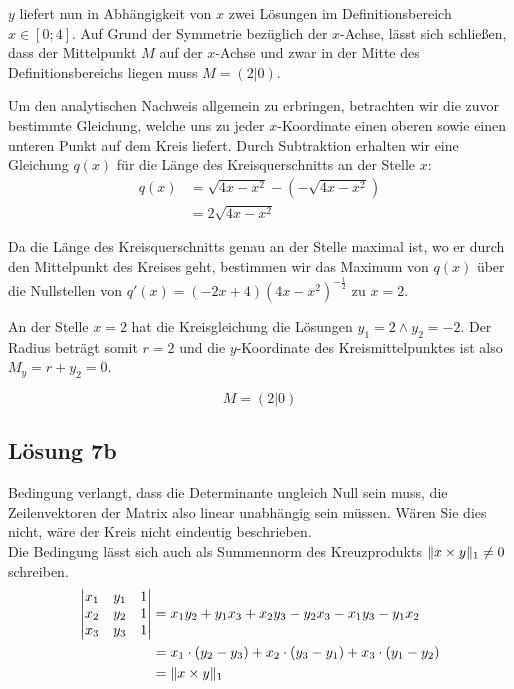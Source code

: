 \documentclass[main.tex]{subfiles}
\begin{document}
$y$ liefert nun in Abhängigkeit von $x$ zwei Lösungen im Definitionsbereich $x \in [0;4]$. 
Auf Grund der Symmetrie bezüglich der $x$-Achse, lässt sich schließen, dass der Mittelpunkt $M$ auf der $x$-Achse und zwar in der Mitte des Definitionsbereichs liegen muss $M=(2|0)$.

Um den analytischen Nachweis allgemein zu erbringen, betrachten wir die zuvor bestimmte Gleichung, welche uns zu jeder $x$-Koordinate einen oberen sowie einen unteren Punkt auf dem Kreis liefert. Durch Subtraktion erhalten wir eine Gleichung $q(x)$ für die Länge des Kreisquerschnitts an der Stelle $x$:
\begin{align*}
    q(x) &= \sqrt{4x - x^2} - \left(-\sqrt{4x - x^2}\right)\\
         &= 2\sqrt{4x - x^2}
\end{align*}

Da die Länge des Kreisquerschnitts genau an der Stelle maximal ist, wo er durch den Mittelpunkt des Kreises geht, bestimmen wir das Maximum von $q(x)$ über die Nullstellen von $q'(x)=(-2x+4)(4x-x^2)^{-\frac{1}{2}}$ zu $x=2$.

An der Stelle $x=2$ hat die Kreisgleichung die Lösungen $y_1=2 \land y_2=-2$. Der Radius beträgt somit $r=2$ und die $y$-Koordinate des Kreismittelpunktes ist also $M_y = r + y_2 = 0$. 

$$
    M = (2|0)
$$

\subsection{Lösung 7b}
Bedingung verlangt, dass die Determinante ungleich Null sein muss, die Zeilenvektoren der Matrix also linear unabhängig sein müssen. Wären Sie dies nicht, wäre der Kreis nicht eindeutig beschrieben. \\

\textcolor{Cerulean}{
Die Bedingung lässt sich auch als Summennorm des Kreuzprodukts $\lVert x \times y\rVert_1 \neq 0$ schreiben.
\begin{align*}
    \begin{vmatrix}
        x_1 & y_1 & 1 \\
        x_2 & y_2 & 1 \\
        x_3 & y_3 & 1 \\
    \end{vmatrix}
    &= x_1y_2 + y_1x_3 + x_2y_3 - y_2x_3 - x_1y_3 - y_1x_2 \\
    &= x_1\cdot (y_2-y_3) + x_2\cdot (y_3-y_1) + x_3\cdot (y_1-y_2)\\
    &= \lVert x \times y\rVert_1
\end{align*}
}
\end{document}
